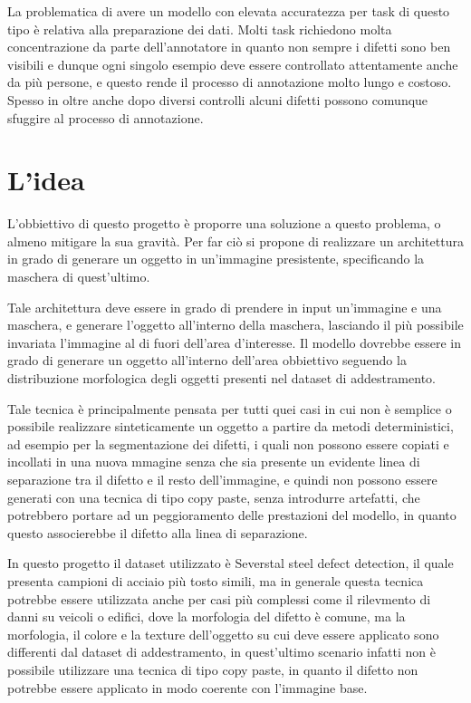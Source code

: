 La problematica di avere un modello con elevata accuratezza per task di questo tipo è relativa alla preparazione dei dati.
Molti task richiedono molta concentrazione da parte dell'annotatore in quanto non sempre i difetti sono ben visibili e dunque ogni singolo
esempio deve essere controllato attentamente anche da più persone, e questo rende il processo di annotazione molto lungo e costoso.
Spesso in oltre anche dopo diversi controlli alcuni difetti possono comunque sfuggire al processo di annotazione.


\section{L'idea \ok}
\begin{comment}
Realizzare un architettura in grado di generare un buona quantità di dati annotati a partire da una quantità ridotta.
TODO: linka paper google su "copy paste technique"
\end{comment}
L'obbiettivo di questo progetto è proporre una soluzione a questo problema, o almeno mitigare la sua gravità.
Per far ciò si propone di realizzare un architettura in grado di generare un oggetto in un'immagine presistente, specificando la maschera di quest'ultimo.

Tale architettura deve essere in grado di prendere in input un'immagine e una maschera, e generare l'oggetto all'interno della maschera, 
lasciando il più possibile invariata l'immagine al di fuori dell'area d'interesse.
Il modello dovrebbe essere in grado di generare un oggetto all'interno dell'area obbiettivo seguendo la distribuzione morfologica degli oggetti 
presenti nel dataset di addestramento.

Tale tecnica è principalmente pensata per tutti quei casi in cui non è semplice o possibile realizzare sinteticamente un oggetto a partire da metodi deterministici, 
ad esempio per la segmentazione dei difetti, i quali non possono essere copiati e incollati in una nuova mmagine senza che sia presente un evidente linea di separazione
tra il difetto e il resto dell'immagine, e quindi non possono essere generati con una tecnica di tipo copy paste, senza introdurre artefatti, che potrebbero 
portare ad un peggioramento delle prestazioni del modello, in quanto questo associerebbe il difetto alla linea di separazione.

In questo progetto il dataset utilizzato è Severstal steel defect detection, il quale presenta campioni di acciaio più tosto simili,
ma in generale questa tecnica potrebbe essere utilizzata anche per casi più complessi come il rilevmento di danni su veicoli o edifici,
dove la morfologia del difetto è comune, ma la morfologia, il colore e la texture dell'oggetto su cui deve essere applicato sono differenti 
dal dataset di addestramento, in quest'ultimo scenario infatti non è possibile utilizzare una tecnica di tipo copy paste, in quanto il difetto 
non potrebbe essere applicato in modo coerente con l'immagine base.